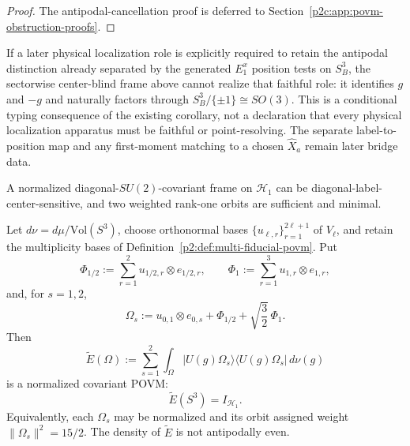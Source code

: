 \documentclass[11pt,a4paper]{article}
\begin{document}
\begin{proof}
The antipodal-cancellation proof is deferred to
Section~\ref{p2c:app:povm-obstruction-proofs}.
\end{proof}

\begin{remark}
\label{p2c:rem:center-blind-localization-firewall}
If a later physical localization role is explicitly required to retain the
antipodal distinction already separated by the generated \(E_1^x\) position
tests on \(S_B^3\), the sectorwise center-blind frame above cannot realize
that faithful role: it identifies \(g\) and \(-g\) and naturally factors
through \(S_B^3/\{\pm1\}\cong SO(3)\).  This is a conditional typing
consequence of the existing corollary, not a declaration that every physical
localization apparatus must be faithful or point-resolving.  The separate
label-to-position map and any first-moment matching to a chosen
\(\widehat X_a\) remain later bridge data.
\end{remark}

\begin{proposition}
\label{p2:prop:center-sensitive-two-orbit-frame}
A normalized diagonal-\(SU(2)\)-covariant frame on \(\mathcal H_1\) can be
diagonal-label-center-sensitive, and two weighted rank-one orbits are sufficient and
minimal.

Let \(d\nu=d\mu/\mathrm{Vol}(S^3)\), choose orthonormal bases
\(\{u_{\ell,r}\}_{r=1}^{2\ell+1}\) of \(V_\ell\), and retain the
multiplicity bases of
Definition~\ref{p2:def:multi-fiducial-povm}.  Put
\[
\Phi_{1/2}:=\sum_{r=1}^{2}
u_{1/2,r}\otimes e_{1/2,r},
\qquad
\Phi_1:=\sum_{r=1}^{3}u_{1,r}\otimes e_{1,r},
\]
and, for \(s=1,2\),
\[
\Omega_s
:=
u_{0,1}\otimes e_{0,s}
+\Phi_{1/2}
+\sqrt{\frac32}\,\Phi_1.
\]
Then
\[
\widetilde E(\Omega)
:=
\sum_{s=1}^{2}
\int_\Omega
|U(g)\Omega_s\rangle\langle U(g)\Omega_s|\,d\nu(g)
\]
is a normalized covariant POVM:
\[
        \widetilde E(S^3)=I_{\mathcal H_1}.
\]
Equivalently, each \(\Omega_s\) may be normalized and its orbit assigned
weight \(\|\Omega_s\|^2=15/2\).  The density of
\(\widetilde E\) is not antipodally even.
\end{proposition}
\end{document}
